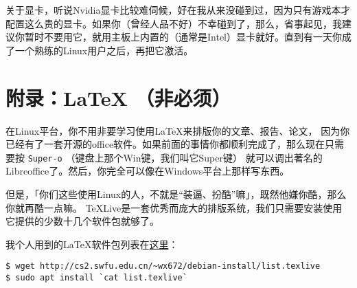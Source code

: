 \documentclass{wx672ctexart}
\begin{document}
关于显卡，听说Nvidia显卡比较难伺候，好在我从来没碰到过，因为只有游戏本才配置这么贵的显卡。如果你（曾经人品不好）不幸碰到了，那么，省事起见，我建议你暂时不要用它，就用主板上内置的（通常是Intel）显卡就好。直到有一天你成了一个熟练的Linux用户之后，再把它激活。
\section{附录：\LaTeX{} （非必须）}
\label{sec:org393216c}
在Linux平台，你不用非要学习使用\LaTeX{}来排版你的文章、报告、论文，
因为你已经有了一套开源的office软件。如果前面的事情你都顺利完成了，那么现在只需要按
\texttt{Super-o} （键盘上那个Win键，我们叫它Super键）
就可以调出著名的Libreoffice了。然后，你完全可以像在Windows平台上那样写东西。

但是，「你们这些使用Linux的人，不就是“装逼、扮酷”嘛」，既然他嫌你酷，那么你就再酷一点嘛。
TeXLive是一套优秀而庞大的排版系统，我们只需要安装使用它提供的少数十几个软件包就够了。

我个人用到的\LaTeX{}软件包列表在\href{http://cs2.swfu.edu.cn/\~wx672/debian-install/list.texlive}{这里}：
\begin{verbatim}
$ wget http://cs2.swfu.edu.cn/~wx672/debian-install/list.texlive
$ sudo apt install `cat list.texlive`
\end{verbatim}
\end{document}
